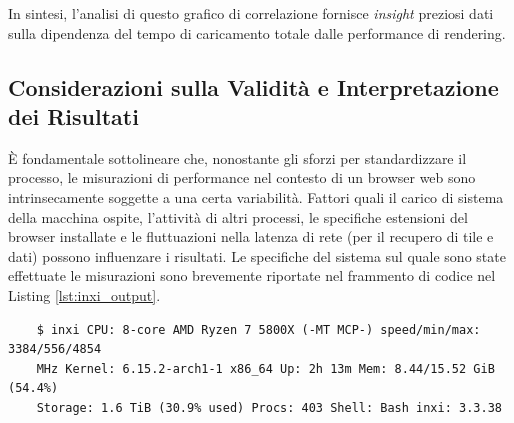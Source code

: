In sintesi, l'analisi di questo grafico di correlazione fornisce \textit{insight}
preziosi dati sulla dipendenza del tempo di caricamento totale dalle performance
di rendering.

\subsection*{Considerazioni sulla Validità e Interpretazione dei Risultati}
È fondamentale sottolineare che, nonostante gli sforzi per standardizzare il
processo, le misurazioni di performance nel contesto di un browser web sono intrinsecamente
soggette a una certa variabilità. Fattori quali il carico di sistema della
macchina ospite, l'attività di altri processi, le specifiche estensioni del
browser installate e le fluttuazioni nella latenza di rete (per il recupero di tile
e dati) possono influenzare i risultati. Le specifiche del sistema sul quale sono
state effettuate le misurazioni sono brevemente riportate nel frammento di codice
nel Listing \ref{lst:inxi_output}.

\begin{listing}
  [H]
  \caption{Output del comando \texttt{inxi}}
  \label{lst:inxi_output}
  \begin{verbatim}
    $ inxi CPU: 8-core AMD Ryzen 7 5800X (-MT MCP-) speed/min/max: 3384/556/4854
    MHz Kernel: 6.15.2-arch1-1 x86_64 Up: 2h 13m Mem: 8.44/15.52 GiB (54.4%)
    Storage: 1.6 TiB (30.9% used) Procs: 403 Shell: Bash inxi: 3.3.38
  \end{verbatim}
\end{listing}